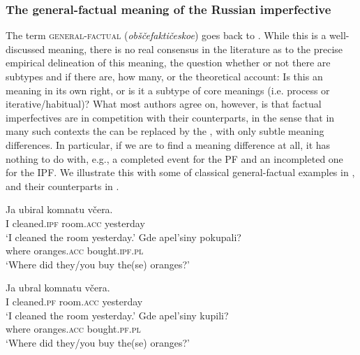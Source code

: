 \documentclass[output=paper,modfonts,newtxmath,hidelinks]{langscibook}
\begin{document}
\subsubsection{The general-factual meaning of the Russian imperfective}
\label{OF}

The term \textsc{general-factual} (\textit{obščefaktičeskoe}) goes back to \citet{maslov59} \citep[for recent discussion see][]{mehlig16}. While this is a well-discussed  meaning, there is no real consensus in the literature \citep[see][chapter 4 for an overview and references]{gronndiss} as to the precise empirical delineation of this meaning, the question whether or not there are subtypes and if there are, how many, or the theoretical account: Is this an  meaning in its own right, or is it a subtype of core  meanings (i.e. process or iterative/habitual)? What most authors agree on, however, is that factual imperfectives are in  competition with their  counterparts, in the sense that in many such contexts the  can be replaced by the , with only subtle meaning differences. In particular, if we are to find a meaning difference at all, it has nothing to do with, e.g., a completed event for the PF and an incompleted one for the IPF. We illustrate this with some of  classical general-factual examples in , and their  counterparts in . 

\ea\label{oranges}
\ea\gll Ja ubiral komnatu včera.\\
       I cleaned.\textsc{ipf} room.\textsc{acc} yesterday\\
\glt       `I cleaned the room yesterday.'
\ex\gll Gde apel'siny pokupali?\\
               where oranges.\textsc{acc} bought.\textsc{ipf}.\textsc{pl} \\
\glt               `Where did they/you buy the(se) oranges?'
\z\z

\ea\label{orangesPF}
\ea\gll Ja ubral komnatu včera.\\
       I cleaned.\textsc{pf} room.\textsc{acc} yesterday\\
\glt       `I cleaned the room yesterday.'
\ex\gll Gde apel'siny kupili?\\
     where oranges.\textsc{acc} bought.\textsc{pf}.\textsc{pl}\\
\glt               `Where did they/you buy the(se) oranges?'
\z\z
\end{document}
